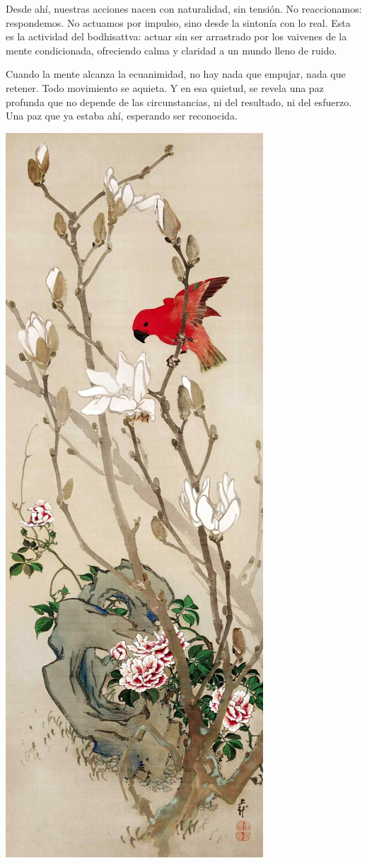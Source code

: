 \documentclass[
  a5paperpaper,
]{article}
\begin{document}
Desde ahí, nuestras acciones nacen con naturalidad, sin tensión. No
reaccionamos: respondemos. No actuamos por impulso, sino desde la
sintonía con lo real. Esta es la actividad del bodhisattva: actuar sin
ser arrastrado por los vaivenes de la mente condicionada, ofreciendo
calma y claridad a un mundo lleno de ruido.

Cuando la mente alcanza la ecuanimidad, no hay nada que empujar, nada
que retener. Todo movimiento se aquieta. Y en esa quietud, se revela una
paz profunda que no depende de las circunstancias, ni del resultado, ni
del esfuerzo. Una paz que ya estaba ahí, esperando ser reconocida.

\hfill\break

\hfill\break

\hypertarget{01}{}
\includegraphics{../img/image12.jpg}
\end{document}
